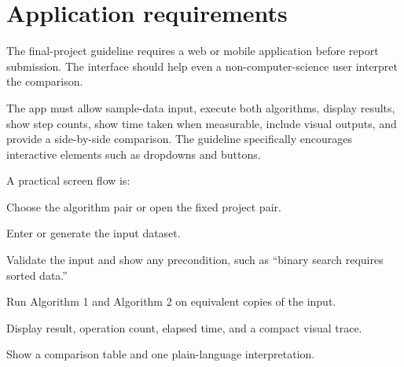 \section{Application requirements}

The final-project guideline requires a web or mobile application before report submission. The interface should help even a non-computer-science user interpret the comparison.

\begin{projectrequirement}
The app must allow sample-data input, execute both algorithms, display results, show step counts, show time taken when measurable, include visual outputs, and provide a side-by-side comparison. The guideline specifically encourages interactive elements such as dropdowns and buttons.
\end{projectrequirement}

A practical screen flow is:

\begin{utpsteps}
  \item Choose the algorithm pair or open the fixed project pair.
  \item Enter or generate the input dataset.
  \item Validate the input and show any precondition, such as ``binary search requires sorted data.''
  \item Run Algorithm 1 and Algorithm 2 on equivalent copies of the input.
  \item Display result, operation count, elapsed time, and a compact visual trace.
  \item Show a comparison table and one plain-language interpretation.
\end{utpsteps}

